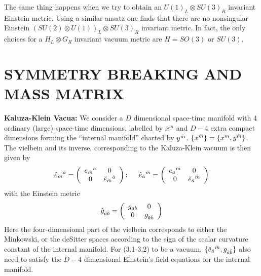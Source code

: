 \documentclass[a4paper,12pt]{article}
\begin{document}
The same thing happens when we try to obtain an  $U(1)_L\otimes SU(3)_R$ invariant Einstein metric. Using a similar ansatz one finds that there are no nonsingular Einstein $(SU(2)\otimes U(1))_L\otimes SU(3)_R$  invariant metric. In fact, the only choices for a $H_L\otimes G_R$ invariant vacuum metric are $H=SO(3)$ or $SU(3)$.
\setcounter{equation}{0}

\section{{\bf   SYMMETRY BREAKING AND MASS MATRIX}}
{\bf Kaluza-Klein Vacua:} We consider a $D$ dimensional space-time manifold with 4 ordinary (large) space-time dimensions, labelled by $x^{m}$  and $D-4$ extra compact dimensions forming the ``internal manifold'' charted by $y^{\breve{m}}$. $\{x^{\hat{m}}\}=\{x^m,y^{\breve{m}}\}$. The vielbein and its inverse, corresponding to the Kaluza-Klein vacuum is then given by
\begin{equation}
\hat{e}_{\hat{m}}{}^{\hat{a}}=\left( \begin{array}{cc}
e_m{}^{a} & 0\\
0 &\breve{e}_{\breve{m}}{}^{\breve{a}}
\end{array} \right);
\hspace{5mm}
\hat{e}_{\hat{a}}{}^{\hat{m}}=\left( \begin{array}{cc}
e_{a}{}^{m} & 0\\
0 &\breve{e}_{\breve{a}}{}^{\breve{m}}
\end{array} \right)
\end{equation}
with the Einstein metric  
\begin{equation}
\hat{g}_{\hat{a}\hat{b}}=\left( \begin{array}{cc}
g_{ab} & 0\\
0 & g_{\breve{a}\breve{b}}
\end{array} \right)
\end{equation}
Here the four-dimensional part of the vielbein corresponds to either the  Minkowski, or the  deSitter spaces according to the sign of the scalar curvature constant of the internal manifold.  For (3.1-3.2) to be a vacuum, $\{\breve{e}_{\breve{a}}{}^{\breve{m}},g_{\breve{a}\breve{b}}\}$ also need to satisfy the $D-4$ dimensional Einstein's field equations for the internal manifold. 
\end{document}
